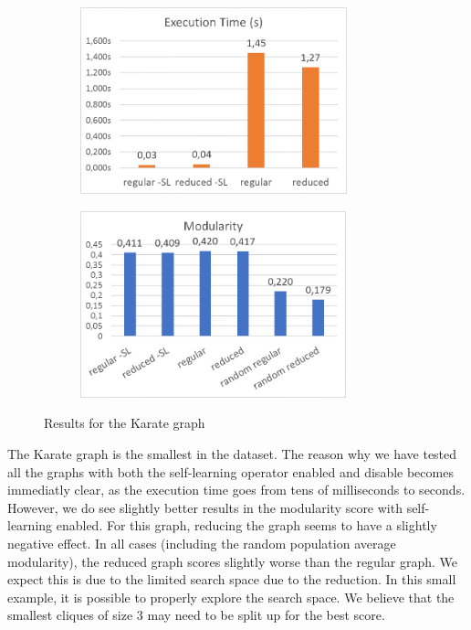 \begin{figure}[H]
\begin{center}
    \begin{subfigure}{0.47\textwidth}
    \begin{center}
    \includegraphics[height=5.4cm]{images/karatetime.png}
    \end{center}
    \end{subfigure}
    \begin{subfigure}{0.47\textwidth}
    \begin{center}
    \includegraphics[height=5.4cm]{images/karatefitness.png}
    \end{center}
    \end{subfigure}
\caption{Results for the Karate graph}\label{fig:karate}
\end{center}
\end{figure}

The Karate graph is the smallest in the dataset. The reason why we have tested all the graphs with both the self-learning operator enabled and disable becomes immediatly clear, as the execution time goes from tens of milliseconds to seconds. However, we do see slightly better results in the modularity score with self-learning enabled. For this graph, reducing the graph seems to have a slightly negative effect. In all cases (including the random population average modularity), the reduced graph scores slightly worse than the regular graph. We expect this is due to the limited search space due to the reduction. In this small example, it is possible to properly explore the search space. We believe that the smallest cliques of size 3 may need to be split up for the best score.
